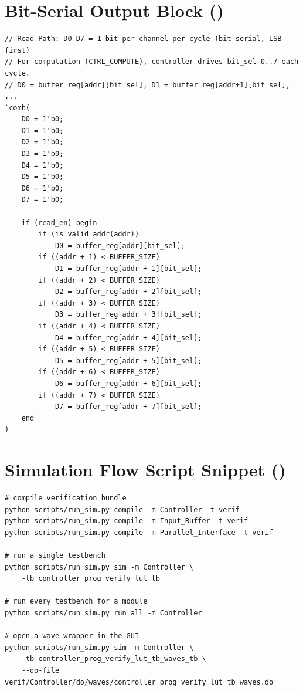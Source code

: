 \section{Bit-Serial Output Block ()}
\label{app:listing-bit-serial}

\begin{lstlisting}[style=svstyle,
    caption={Bit-serial lane generation in \modname{input\_buffer}.
             From \sv{source/Input\_Buffer/input\_buffer.sv}.},
    label={lst:bit-serial}]
// Read Path: D0-D7 = 1 bit per channel per cycle (bit-serial, LSB-first)
// For computation (CTRL_COMPUTE), controller drives bit_sel 0..7 each cycle.
// D0 = buffer_reg[addr][bit_sel], D1 = buffer_reg[addr+1][bit_sel], ...
`comb(
    D0 = 1'b0;
    D1 = 1'b0;
    D2 = 1'b0;
    D3 = 1'b0;
    D4 = 1'b0;
    D5 = 1'b0;
    D6 = 1'b0;
    D7 = 1'b0;

    if (read_en) begin
        if (is_valid_addr(addr))
            D0 = buffer_reg[addr][bit_sel];
        if ((addr + 1) < BUFFER_SIZE)
            D1 = buffer_reg[addr + 1][bit_sel];
        if ((addr + 2) < BUFFER_SIZE)
            D2 = buffer_reg[addr + 2][bit_sel];
        if ((addr + 3) < BUFFER_SIZE)
            D3 = buffer_reg[addr + 3][bit_sel];
        if ((addr + 4) < BUFFER_SIZE)
            D4 = buffer_reg[addr + 4][bit_sel];
        if ((addr + 5) < BUFFER_SIZE)
            D5 = buffer_reg[addr + 5][bit_sel];
        if ((addr + 6) < BUFFER_SIZE)
            D6 = buffer_reg[addr + 6][bit_sel];
        if ((addr + 7) < BUFFER_SIZE)
            D7 = buffer_reg[addr + 7][bit_sel];
    end
)
\end{lstlisting}

\section{Simulation Flow Script Snippet ()}
\label{app:listing-runsim}

\begin{lstlisting}[style=plainstyle,language={},
    caption={Representative commands from
             \sv{scripts/run\_sim.py}. The script wraps \sv{vlog}
             (compilation) and \sv{vsim} (simulation), and supports
             \sv{list}, \sv{compile}, \sv{sim}, \sv{run\_all}, and
             \sv{clean} subcommands.},
    label={lst:runsim}]
# compile verification bundle
python scripts/run_sim.py compile -m Controller -t verif
python scripts/run_sim.py compile -m Input_Buffer -t verif
python scripts/run_sim.py compile -m Parallel_Interface -t verif

# run a single testbench
python scripts/run_sim.py sim -m Controller \
    -tb controller_prog_verify_lut_tb

# run every testbench for a module
python scripts/run_sim.py run_all -m Controller

# open a wave wrapper in the GUI
python scripts/run_sim.py sim -m Controller \
    -tb controller_prog_verify_lut_tb_waves_tb \
    --do-file verif/Controller/do/waves/controller_prog_verify_lut_tb_waves.do
\end{lstlisting}
